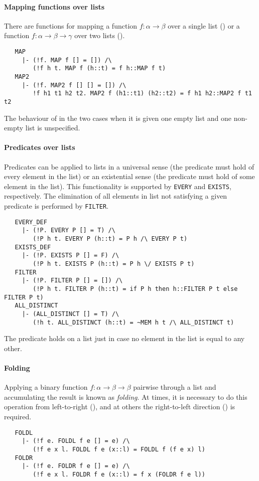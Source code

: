 \paragraph {Mapping functions over lists}

There are functions for mapping a function $f : \alpha \to \beta$ over
a single list () or a function $f : \alpha \to \beta
\to \gamma$ over two lists ().
%
{\small
\begin{verbatim}
   MAP
     |- (!f. MAP f [] = []) /\
        (!f h t. MAP f (h::t) = f h::MAP f t)
   MAP2
     |- (!f. MAP2 f [] [] = []) /\
        !f h1 t1 h2 t2. MAP2 f (h1::t1) (h2::t2) = f h1 h2::MAP2 f t1 t2
\end{verbatim}
}
%
The behaviour of  in the two cases when it is given
one empty list and one non-empty list is unspecified.

\paragraph {Predicates over lists}

Predicates can be applied to lists in a universal sense (the predicate
must hold of every element in the list) or an existential sense (the
predicate must hold of some element in the list). This functionality
is supported by {\small\verb+EVERY+} and {\small\verb+EXISTS+},
respectively. The elimination of all elements in list not satisfying
a given predicate is performed by {\small\verb+FILTER+}.
%
{\small
\begin{verbatim}
   EVERY_DEF
     |- (!P. EVERY P [] = T) /\
        (!P h t. EVERY P (h::t) = P h /\ EVERY P t)
   EXISTS_DEF
     |- (!P. EXISTS P [] = F) /\
        (!P h t. EXISTS P (h::t) = P h \/ EXISTS P t)
   FILTER
     |- (!P. FILTER P [] = []) /\
        (!P h t. FILTER P (h::t) = if P h then h::FILTER P t else FILTER P t)
   ALL_DISTINCT
     |- (ALL_DISTINCT [] = T) /\
        (!h t. ALL_DISTINCT (h::t) = ~MEM h t /\ ALL_DISTINCT t)
\end{verbatim}
}
%
The predicate  holds on a list  just
in case no element in the list is equal to any other.

\paragraph {Folding}

Applying a binary function $f : \alpha\to\beta\to\beta$ pairwise
through a list and accumulating the result is known as
\emph{folding}. At times, it is necessary to do this operation
from left-to-right (), and at others the
right-to-left direction () is required.
%
{\small
\begin{verbatim}
   FOLDL
     |- (!f e. FOLDL f e [] = e) /\
        (!f e x l. FOLDL f e (x::l) = FOLDL f (f e x) l)
   FOLDR
     |- (!f e. FOLDR f e [] = e) /\
        (!f e x l. FOLDR f e (x::l) = f x (FOLDR f e l))
\end{verbatim}
}

